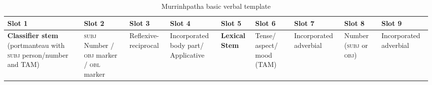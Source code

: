 \documentclass[output=paper,colorlinks,citecolor=brown]{langscibook}
\begin{document}
\begin{table}
\begin{tabularx}{\textwidth}{@{}Q|Q|Q|p{20mm}|p{12mm}|p{12mm}|p{20mm}|Q|p{20mm}@{}}
{Slot 1} & {Slot 2} & {Slot 3} & {Slot 4} & {Slot 5} & {Slot 6} & {Slot 7} & {Slot 8} & {Slot 9}\\
\hline
\textbf{Classifier stem} (portmanteau with \textsc{subj} person/number and TAM) & {\textsc{subj} Number / \textsc{obj} marker / \textsc{obl} marker} & {Reflexive-reciprocal} & {Incorporated body part/\newline  Applicative} & \textbf{Lexical Stem} & {Tense/ aspect/ mood (TAM)} & {Incorporated adverbial} & {Number (\textsc{subj} or \textsc{obj})} & {Incorporated adverbial} \\
\end{tabularx}
\caption{Murrinhpatha basic verbal template}
\label{tab:mur:1}
\end{table}

\end{document}
